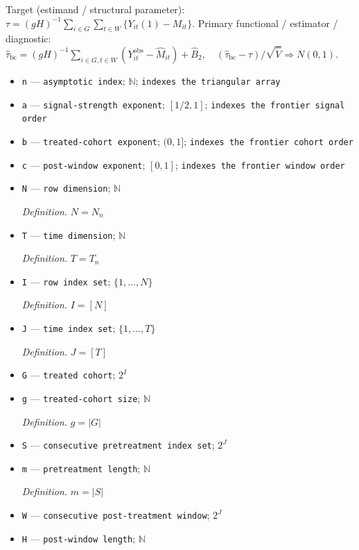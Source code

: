 \documentclass{article}
\begin{document}
Target (estimand / structural parameter): \(\tau=(gH)^{-1}\sum_{i\in G}\sum_{t\in W}\{Y_{it}(1)-M_{it}\}\).
Primary functional / estimator / diagnostic: \(\widehat\tau_{\mathrm{bc}}=(gH)^{-1}\sum_{i\in G,t\in W}(Y^{\mathrm{obs}}_{it}-\widehat M_{it})+\widehat B_2,\quad (\widehat\tau_{\mathrm{bc}}-\tau)/\sqrt{\widehat V}\Rightarrow N(0,1)\).
\begin{itemize}
  \item \texttt{n} --- \texttt{asymptotic index}; \(\mathbb N\); \texttt{indexes the triangular array}
  \item \texttt{a} --- \texttt{signal-\allowbreak{}strength exponent}; \([1/2,1]\); \texttt{indexes the frontier signal order}
  \item \texttt{b} --- \texttt{treated-\allowbreak{}cohort exponent}; \((0,1]\); \texttt{indexes the frontier cohort order}
  \item \texttt{c} --- \texttt{post-\allowbreak{}window exponent}; \([0,1]\); \texttt{indexes the frontier window order}
  \item \texttt{N} --- \texttt{row dimension}; \(\mathbb N\)
  \par\smallskip\noindent\emph{Definition.} \(N=N_n\)
  \item \texttt{T} --- \texttt{time dimension}; \(\mathbb N\)
  \par\smallskip\noindent\emph{Definition.} \(T=T_n\)
  \item \texttt{I} --- \texttt{row index set}; \(\{1,\ldots,N\}\)
  \par\smallskip\noindent\emph{Definition.} \(I=[N]\)
  \item \texttt{J} --- \texttt{time index set}; \(\{1,\ldots,T\}\)
  \par\smallskip\noindent\emph{Definition.} \(J=[T]\)
  \item \texttt{G} --- \texttt{treated cohort}; \(2^I\)
  \item \texttt{g} --- \texttt{treated-\allowbreak{}cohort size}; \(\mathbb N\)
  \par\smallskip\noindent\emph{Definition.} \(g=|G|\)
  \item \texttt{S} --- \texttt{consecutive pretreatment index set}; \(2^J\)
  \item \texttt{m} --- \texttt{pretreatment length}; \(\mathbb N\)
  \par\smallskip\noindent\emph{Definition.} \(m=|S|\)
  \item \texttt{W} --- \texttt{consecutive post-\allowbreak{}treatment window}; \(2^J\)
  \item \texttt{H} --- \texttt{post-\allowbreak{}window length}; \(\mathbb N\)

\end{itemize}
\end{document}
